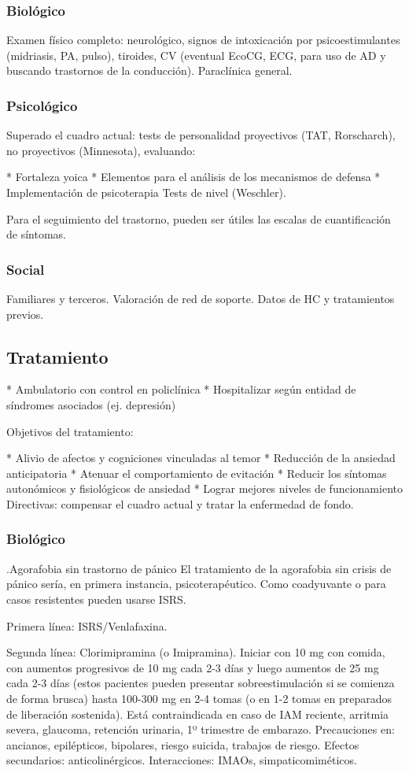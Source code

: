 \subsubsection*{Biológico}
Examen físico completo: neurológico, signos de intoxicación por psicoestimulantes (midriasis, PA, pulso), tiroides, CV (eventual EcoCG, ECG, para uso de AD y buscando trastornos de la conducción). Paraclínica general.
\subsubsection*{Psicológico}
Superado el cuadro actual: tests de personalidad proyectivos (TAT, Rorscharch), no proyectivos (Minnesota), evaluando:

* Fortaleza yoica
* Elementos para el análisis de los mecanismos de defensa
* Implementación de psicoterapia Tests de nivel (Weschler).

Para el seguimiento del trastorno, pueden ser útiles las escalas de cuantificación de síntomas.
\subsubsection*{Social}
Familiares y terceros. Valoración de red de soporte. Datos de HC y tratamientos previos.
\subsection*{Tratamiento}
* Ambulatorio con control en policlínica
* Hospitalizar según entidad de síndromes asociados (ej. depresión)

Objetivos del tratamiento:

* Alivio de afectos y cogniciones vinculadas al temor
* Reducción de la ansiedad anticipatoria
* Atenuar el comportamiento de evitación
* Reducir los síntomas autonómicos y fisiológicos de ansiedad
* Lograr mejores niveles de funcionamiento Directivas: compensar el cuadro actual y tratar la enfermedad de fondo.
\subsubsection*{Biológico}
.Agorafobia sin trastorno de pánico
El tratamiento de la agorafobia sin crisis de pánico sería, en primera instancia, psicoterapéutico. Como coadyuvante o para casos resistentes pueden usarse ISRS.

Primera línea: ISRS/Venlafaxina.

Segunda línea: Clorimipramina (o Imipramina). Iniciar con 10 mg con comida, con aumentos progresivos de 10 mg cada 2-3 días y luego aumentos de 25 mg cada 2-3 días (estos pacientes pueden presentar sobreestimulación si se comienza de forma brusca) hasta 100-300 mg en 2-4 tomas (o en 1-2 tomas en preparados de liberación sostenida). Está contraindicada en caso de IAM reciente, arritmia severa, glaucoma, retención urinaria, 1º trimestre de embarazo. Precauciones en: ancianos, epilépticos, bipolares, riesgo suicida, trabajos de riesgo. Efectos secundarios: anticolinérgicos. Interacciones: IMAOs, simpaticomiméticos.

